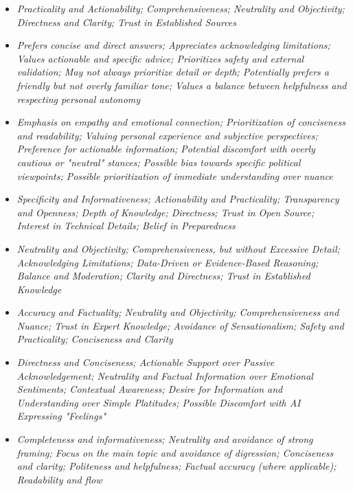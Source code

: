 \documentclass[11pt]{article}
\newcommand{\profiletext}[1]{\textit{#1}}
\begin{document}
\begin{itemize}
\item \profiletext{Practicality and Actionability; Comprehensiveness; Neutrality and Objectivity; Directness and Clarity; Trust in Established Sources}
\item \profiletext{Prefers concise and direct answers; Appreciates acknowledging limitations; Values actionable and specific advice; Prioritizes safety and external validation; May not always prioritize detail or depth; Potentially prefers a friendly but not overly familiar tone; Values a balance between helpfulness and respecting personal autonomy}
\item \profiletext{Emphasis on empathy and emotional connection; Prioritization of conciseness and readability; Valuing personal experience and subjective perspectives; Preference for actionable information; Potential discomfort with overly cautious or "neutral" stances; Possible bias towards specific political viewpoints; Possible prioritization of immediate understanding over nuance}
\item \profiletext{Specificity and Informativeness; Actionability and Practicality; Transparency and Openness; Depth of Knowledge; Directness; Trust in Open Source; Interest in Technical Details; Belief in Preparedness}
\item \profiletext{Neutrality and Objectivity; Comprehensiveness, but without Excessive Detail; Acknowledging Limitations; Data-Driven or Evidence-Based Reasoning; Balance and Moderation; Clarity and Directness; Trust in Established Knowledge}
\item \profiletext{Accuracy and Factuality; Neutrality and Objectivity; Comprehensiveness and Nuance; Trust in Expert Knowledge; Avoidance of Sensationalism; Safety and Practicality; Conciseness and Clarity}
\item \profiletext{Directness and Conciseness; Actionable Support over Passive Acknowledgement; Neutrality and Factual Information over Emotional Sentiments; Contextual Awareness; Desire for Information and Understanding over Simple Platitudes; Possible Discomfort with AI Expressing "Feelings"}
\item \profiletext{Completeness and informativeness; Neutrality and avoidance of strong framing; Focus on the main topic and avoidance of digression; Conciseness and clarity; Politeness and helpfulness; Factual accuracy (where applicable); Readability and flow}
\end{itemize}
\end{document}
